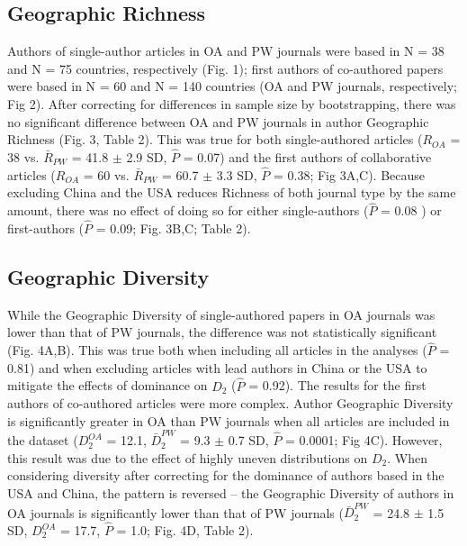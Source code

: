 \documentclass[english,man]{apa6}
\begin{document}
\hypertarget{geographic-richness}{%
\subsection{Geographic Richness}\label{geographic-richness}}

Authors of single-author articles in OA and PW journals were based in N = 38 and N = 75 countries, respectively (Fig. 1); first authors of co-authored papers were based in N = 60 and N = 140 countries (OA and PW journals, respectively; Fig 2). After correcting for differences in sample size by bootstrapping, there was no significant difference between OA and PW journals in author Geographic Richness (Fig. 3, Table 2). This was true for both single-authored articles (\(R_{OA}\) = 38 vs. \(\bar{R}_{PW}\) = 41.8 \(\pm\) 2.9 SD, \(\hat{P}\) = 0.07) and the first authors of collaborative articles (\(R_{OA}\) = 60 vs. \(\bar{R}_{PW}\) = 60.7 \(\pm\) 3.3 SD, \(\hat{P}\) = 0.38; Fig 3A,C). Because excluding China and the USA reduces Richness of both journal type by the same amount, there was no effect of doing so for either single-authors (\(\hat{P}\) = 0.08 ) or first-authors (\(\hat{P}\) = 0.09; Fig. 3B,C; Table 2).

\hypertarget{geographic-diversity}{%
\subsection{Geographic Diversity}\label{geographic-diversity}}

While the Geographic Diversity of single-authored papers in OA journals was lower than that of PW journals, the difference was not statistically significant (Fig. 4A,B). This was true both when including all articles in the analyses (\(\hat{P}\) = 0.81) and when excluding articles with lead authors in China or the USA to mitigate the effects of dominance on \(D_2\) (\(\hat{P}\) = 0.92). The results for the first authors of co-authored articles were more complex. Author Geographic Diversity is significantly greater in OA than PW journals when all articles are included in the dataset (\(D_2^{OA}\) = 12.1, \(\bar{D}_2^{PW}\) = 9.3 \(\pm\) 0.7 SD, \(\hat{P}\) = 0.0001; Fig 4C). However, this result was due to the effect of highly uneven distributions on \(D_{2}\). When considering diversity after correcting for the dominance of authors based in the USA and China, the pattern is reversed -- the Geographic Diversity of authors in OA journals is significantly lower than that of PW journals (\(\bar{D}_2^{PW}\) = 24.8 \(\pm\) 1.5 SD, \(D_2^{OA}\) = 17.7, \(\hat{P}\) = 1.0; Fig. 4D, Table 2).
\end{document}
